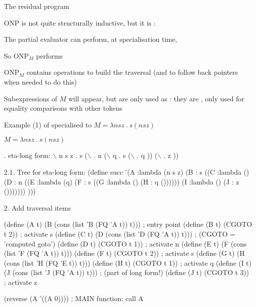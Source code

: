 \documentclass[12pt,fleqn,landscape]{article}
\begin{document}
\begin{slide}{The  residual program\ \    }


ONP is not quite  structurally inductive, but  it is :
\vair

\hfill{}
\vair


\bi
\item The partial evaluator can perform, at specialisation time, 
\vair

\item So ONP$_M$ performs 
\vair

\item ONP$_M$ contains  operations to build the traversal (and to follow back pointers when needed to do this)
\vair

\item Subexpressions of $M$ will appear, but are only used as : they are , only used for equality comparisons with other tokens

\ei\end{slide}






\begin{slide}{Example (1) of  specialised to 
$M=$\lowercase{$ \lambda n s z \ .\  s (n s z)$} }

$M = \lambda n s z \ .\  s (n s z)$

. eta-long form:  $\backslash$ n s z . s ($\backslash$ . n ($\backslash$ q . s ($\backslash$ . q )) ($\backslash$ . z ))

2.1. Tree for eta-long form:
(define succ
'(A :lambda (n s z)
  (B : s
     ((C :lambda () (D : n ((E :lambda (q) (F : s ((G :lambda () (H : q ())))))
                            (I :lambda () (J : z ()))))))
    )))
  
2. Add traversal items
  
  (define (A t) (B (cons (list 'B (FQ 'A t)) t)))  ; entry point
  (define (B t) (CGOTO t 2))                       ; activate s
  (define (C t) (D (cons (list 'D (FQ 'A t)) t)))  ;   (CGOTO = 'computed goto')
  (define (D t) (CGOTO t 1))                       ; activate n
  (define (E t) (F (cons (list 'F (FQ 'A t)) t)))
  (define (F t) (CGOTO t 2))                       ; activate s
  (define (G t) (H (cons (list 'H (FQ 'E t)) t)))
  (define (H t) (CGOTO t 1))                       ; activate q
  (define (I t) (J (cons (list 'J (FQ 'A t)) t)))  ;  (part of long form!)
  (define (J t) (CGOTO t 3))                       ; activate z
  
  (reverse (A '((A 0))))                           ; MAIN function: call A

\ep
\end{slide}
\end{document}
